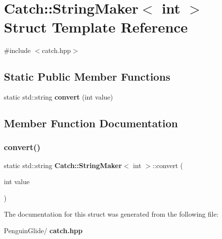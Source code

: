 \section{Catch\+::String\+Maker$<$ int $>$ Struct Template Reference}
\label{struct_catch_1_1_string_maker_3_01int_01_4}


{\ttfamily \#include $<$catch.\+hpp$>$}

\subsection*{Static Public Member Functions}
\begin{DoxyCompactItemize}
\item 
static std\+::string \textbf{ convert} (int value)
\end{DoxyCompactItemize}


\subsection{Member Function Documentation}
\mbox{\label{struct_catch_1_1_string_maker_3_01int_01_4_aab096e55fb7283f6ad47b5ca277e22e8}} 
\subsubsection{convert()}
{\footnotesize\ttfamily static std\+::string \textbf{ Catch\+::\+String\+Maker}$<$ int $>$\+::convert (\begin{DoxyParamCaption}\item[{int}]{value }\end{DoxyParamCaption})\hspace{0.3cm}{\ttfamily [static]}}



The documentation for this struct was generated from the following file\+:\begin{DoxyCompactItemize}
\item 
Penguin\+Glide/\textbf{ catch.\+hpp}\end{DoxyCompactItemize}
